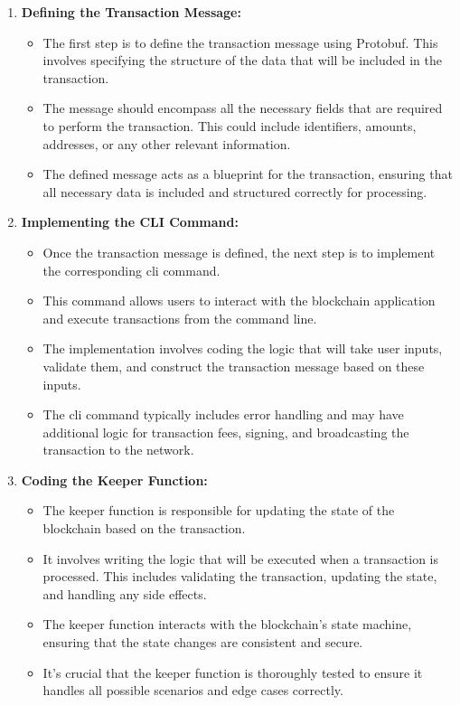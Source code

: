 \begin{enumerate}
    \item \textbf{Defining the Transaction Message:}
    \begin{itemize}
        \item The first step is to define the transaction message using Protobuf. This involves specifying the structure of the data that will be included in the transaction. 
        \item The message should encompass all the necessary fields that are required to perform the transaction. This could include identifiers, amounts, addresses, or any other relevant information.
        \item The defined message acts as a blueprint for the transaction, ensuring that all necessary data is included and structured correctly for processing.
    \end{itemize}

    \item \textbf{Implementing the CLI Command:}
    \begin{itemize}
        \item Once the transaction message is defined, the next step is to implement the corresponding \gls{cli} command.
        \item This command allows users to interact with the blockchain application and execute transactions from the command line.
        \item The implementation involves coding the logic that will take user inputs, validate them, and construct the transaction message based on these inputs.
        \item The \gls{cli} command typically includes error handling and may have additional logic for transaction fees, signing, and broadcasting the transaction to the network.
    \end{itemize}
\newpage
    \item \textbf{Coding the Keeper Function:}
    \begin{itemize}
        \item The keeper function is responsible for updating the state of the blockchain based on the transaction.
        \item It involves writing the logic that will be executed when a transaction is processed. This includes validating the transaction, updating the state, and handling any side effects.
        \item The keeper function interacts with the blockchain's state machine, ensuring that the state changes are consistent and secure.
        \item It's crucial that the keeper function is thoroughly tested to ensure it handles all possible scenarios and edge cases correctly.
    \end{itemize}
\end{enumerate}

